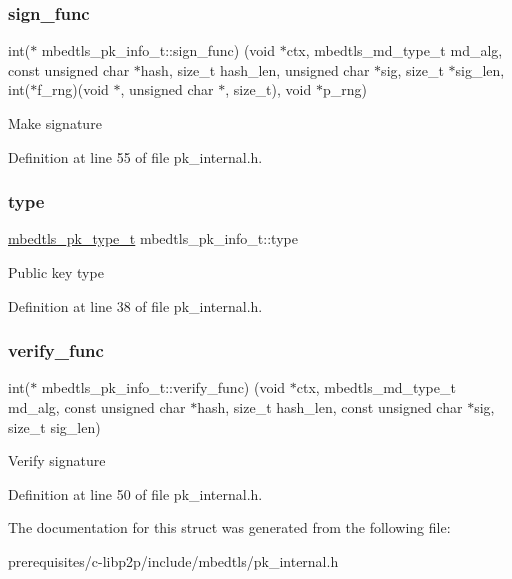 \subsubsection{\texorpdfstring{sign\+\_\+func}{sign\_func}}
{\footnotesize\ttfamily int($\ast$ mbedtls\+\_\+pk\+\_\+info\+\_\+t\+::sign\+\_\+func) (void $\ast$ctx, mbedtls\+\_\+md\+\_\+type\+\_\+t md\+\_\+alg, const unsigned char $\ast$hash, size\+\_\+t hash\+\_\+len, unsigned char $\ast$sig, size\+\_\+t $\ast$sig\+\_\+len, int($\ast$f\+\_\+rng)(void $\ast$, unsigned char $\ast$, size\+\_\+t), void $\ast$p\+\_\+rng)}

Make signature 

Definition at line 55 of file pk\+\_\+internal.\+h.

\mbox{\label{structmbedtls__pk__info__t_a1290aa516e4b5889952f56edf331c313}} 
\subsubsection{\texorpdfstring{type}{type}}
{\footnotesize\ttfamily \mbox{\hyperlink{pk_8h_a3fe41eff5605ae727eb9d28dad297020}{mbedtls\+\_\+pk\+\_\+type\+\_\+t}} mbedtls\+\_\+pk\+\_\+info\+\_\+t\+::type}

Public key type 

Definition at line 38 of file pk\+\_\+internal.\+h.

\mbox{\label{structmbedtls__pk__info__t_aba8b768e152806bc28322004a522dc0c}} 
\subsubsection{\texorpdfstring{verify\+\_\+func}{verify\_func}}
{\footnotesize\ttfamily int($\ast$ mbedtls\+\_\+pk\+\_\+info\+\_\+t\+::verify\+\_\+func) (void $\ast$ctx, mbedtls\+\_\+md\+\_\+type\+\_\+t md\+\_\+alg, const unsigned char $\ast$hash, size\+\_\+t hash\+\_\+len, const unsigned char $\ast$sig, size\+\_\+t sig\+\_\+len)}

Verify signature 

Definition at line 50 of file pk\+\_\+internal.\+h.



The documentation for this struct was generated from the following file\+:\begin{DoxyCompactItemize}
\item 
prerequisites/c-\/libp2p/include/mbedtls/pk\+\_\+internal.\+h\end{DoxyCompactItemize}
